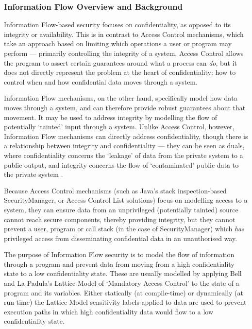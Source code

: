 \subsubsection{Information Flow Overview and Background}

Information Flow-based security focuses on confidentiality, as opposed to its integrity or availability. This is in contrast to Access Control mechanisms, which take an approach based on limiting which operations a user or program may perform --- primarily controlling the integrity of a system. Access Control allows the program to assert certain guarantees around what a process can \textit{do}, but it does not directly represent the problem at the heart of confidentiality: how to control when and how confidential data moves through a system.

Information Flow mechanisms, on the other hand, specifically model how data moves through a system, and can therefore provide robust guarantees about that movement. It may be used to address integrity by modelling the flow of potentially `tainted' input through a system. Unlike Access Control, however, Information Flow mechanisms can directly address confidentiality, though there is a relationship between integrity and confidentiality --- they can be seen as duals, where confidentiality concerns the `leakage' of data from the private system to a public output, and integrity concerns the flow of `contaminated' public data to the private system \cite{biba1977integrity} \cite{clarkson2010confintegrity}.

Because Access Control mechanisms (such as Java's stack inspection-based SecurityManager, or Access Control List solutions) focus on modelling access to a system, they can ensure data from an unprivileged (potentially tainted) source cannot reach secure components, thereby providing integrity, but they cannot prevent a user, program or call stack (in the case of SecurityManager) which \textit{has} privileged access from disseminating confidential data in an unauthorised way.

The purpose of Information Flow security is to model the flow of information through a program and prevent data from moving from a high confidentiality state to a low confidentiality state. These are usually modelled by applying Bell and La Padula's Lattice Model \cite{bell1976lattice} of `Mandatory Access Control' to the state of a program and its variables. Either statically (at compile-time) or dynamically (at run-time) the Lattice Model sensitivity labels applied to data are used to prevent execution paths in which high confidentiality data would flow to a low confidentiality state.

